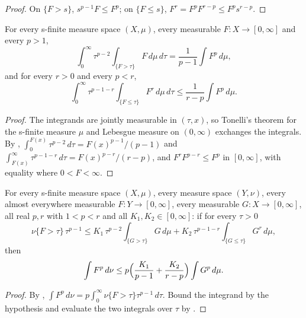 \begin{proof}
\leanok
On $\{F > s\}$, $s^{p-1} F \leq F^p$; on $\{F \leq s\}$, $F^r = F^p F^{r-p} \leq F^p s^{r-p}$.
\end{proof}

\begin{lemma}
\label{lem:tonelli-steps-measure-space}
\leanok
{}
For every s-finite measure space $(X, \mu)$, every measurable $F : X \to [0, \infty]$ and every
$p > 1$,
\[
  \int_0^\infty \tau^{p-2} \int_{\{F > \tau\}} F \, d\mu \, d\tau
  = \frac{1}{p - 1} \int F^p \, d\mu ,
\]
and for every $r > 0$ and every $p < r$,
\[
  \int_0^\infty \tau^{p-1-r} \int_{\{F \leq \tau\}} F^r \, d\mu \, d\tau
  \leq \frac{1}{r - p} \int F^p \, d\mu .
\]
\end{lemma}

\begin{proof}
\leanok
The integrands are jointly measurable in $(\tau, x)$, so Tonelli's theorem for the s-finite
measure $\mu$ and Lebesgue measure on $(0, \infty)$ exchanges the integrals. By
, $\int_0^{F(x)} \tau^{p-2} \, d\tau = F(x)^{p-1}/(p-1)$ and
$\int_{F(x)}^\infty \tau^{p-1-r} \, d\tau = F(x)^{p-r}/(r-p)$, and $F^r F^{p-r} \leq F^p$ in
$[0, \infty]$, with equality where $0 < F < \infty$.
\end{proof}

\begin{lemma}
\label{lem:power-integral-from-levels}
\leanok
{}
For every s-finite measure space $(X, \mu)$, every measure space $(Y, \nu)$, every almost
everywhere measurable $F : Y \to [0, \infty]$, every measurable $G : X \to [0, \infty]$, all
real $p, r$ with $1 < p < r$ and all $K_1, K_2 \in [0, \infty]$: if for every $\tau > 0$
\[
  \nu\{F > \tau\} \, \tau^{p-1}
  \leq K_1 \, \tau^{p-2} \int_{\{G > \tau\}} G \, d\mu
  + K_2 \, \tau^{p-1-r} \int_{\{G \leq \tau\}} G^r \, d\mu ,
\]
then
\[
  \int F^p \, d\nu \leq p \Bigl( \frac{K_1}{p - 1} + \frac{K_2}{r - p} \Bigr) \int G^p \, d\mu .
\]
\end{lemma}

\begin{proof}
\leanok
By , $\int F^p \, d\nu = p \int_0^\infty \nu\{F > \tau\} \tau^{p-1} \,
d\tau$. Bound the integrand by the hypothesis and evaluate the two integrals over $\tau$ by
.
\end{proof}

